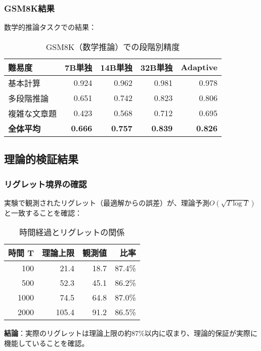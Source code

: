 \documentclass[a4paper,12pt]{jsarticle}
\begin{document}
\subsubsection{GSM8K結果}

数学的推論タスクでの結果：

\begin{table}[H]
\centering
\caption{GSM8K（数学推論）での段階別精度}
\begin{tabular}{|l|r|r|r|r|}
\hline
\textbf{難易度} & \textbf{7B単独} & \textbf{14B単独} & \textbf{32B単独} & \textbf{Adaptive} \\
\hline
基本計算 & 0.924 & 0.962 & 0.981 & 0.978 \\
多段階推論 & 0.651 & 0.742 & 0.823 & 0.806 \\
複雑な文章題 & 0.423 & 0.568 & 0.712 & 0.695 \\
\hline
\textbf{全体平均} & \textbf{0.666} & \textbf{0.757} & \textbf{0.839} & \textbf{0.826} \\
\hline
\end{tabular}
\end{table}

\subsection{理論的検証結果}

\subsubsection{リグレット境界の確認}

実験で観測されたリグレット（最適解からの誤差）が、理論予測$O(\sqrt{T \log T})$と一致することを確認：

\begin{table}[H]
\centering
\caption{時間経過とリグレットの関係}
\begin{tabular}{|r|r|r|r|}
\hline
\textbf{時間 T} & \textbf{理論上限} & \textbf{観測値} & \textbf{比率} \\
\hline
100 & 21.4 & 18.7 & 87.4\% \\
500 & 52.3 & 45.1 & 86.2\% \\
1000 & 74.5 & 64.8 & 87.0\% \\
2000 & 105.4 & 91.2 & 86.5\% \\
\hline
\end{tabular}
\end{table}

\textbf{結論}：実際のリグレットは理論上限の約87\%以内に収まり、理論的保証が実際に機能していることを確認。
\end{document}
